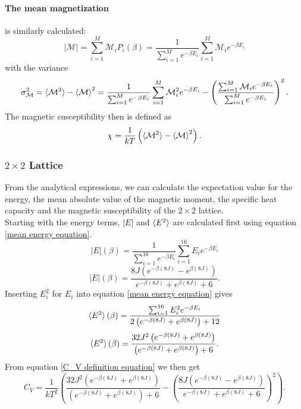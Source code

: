 \documentclass[10pt,a4paper]{article}
\begin{document}
\paragraph{The mean magnetization} is similarly calculated:
\begin{equation} \label{Mean magnetization definition equation}
 |\mathcal{M}| = \sum_{i=1}^{M} \mathcal{M}_iP_i(\beta) = \frac{1}{\sum_{i=1}^M e^{-\beta E_i}} \sum_{i=1}^M \mathcal{M}_ie^{-\beta E_i}
\end{equation} 
with the variance
\begin{equation}
\sigma_\mathcal{M}^2 = \braket{\mathcal{M}^2}-\braket{\mathcal{M}}^2 = \frac{1}{\sum_{i=1}^M e^{-\beta E_i}} \sum_{i=1}^M \mathcal{M}_i^2e^{-\beta E_i} - \left( \frac{\sum_{i=1}^M \mathcal{M}_ie^{-\beta E_i}}{\sum_{i=1}^M e^{-\beta E_i}} \right)^2.
\end{equation}
The magnetic susceptibility then is defined as
\begin{equation}\label{Magnetic susceptibility definition equation}
\chi = \frac{1}{kT} \left( \braket{\mathcal{M}^2}-\braket{\mathcal{M}}^2 \right).
\end{equation}
\subsubsection{$2\times2$ Lattice}
From the analytical expressions, we can calculate the expectation value for the energy, the mean absolute value of the magnetic moment, the specific heat capacity and the magnetic susceptibility of the $2\times 2$ lattice.\\Starting with the energy terms, $|E|$ and $\braket{E^2}$ are calculated first using equation \eqref{mean energy equation}.
\begin{equation*}
|E|(\beta) = \frac{1}{\sum_{i=1}^{16} e^{-\beta E_i}} \sum_{i=1}^{16} E_ie^{-\beta E_i}
\end{equation*}
\begin{equation}
|E|(\beta) = \frac{8J\left( e^{-\beta (8J)} -e^{\beta (8J)} \right)}{ e^{-\beta (8J)} +e^{\beta (8J)} +6}.
\end{equation}
Inserting $E_i^2$ for $E_i$ into equation \eqref{mean energy equation} gives
\begin{equation*}
\braket{E^2}(\beta) = \frac{\sum_{i=1}^{16} E_i^2e^{-\beta E_i}}{2\left( e^{-\beta (8J)} +e^{\beta (8J)} \right)+12}
\end{equation*}
\begin{equation}
\braket{E^2}(\beta) = \frac{32J^2\left( e^{-\beta (8J)} +e^{\beta (8J)} \right)}{\left( e^{-\beta (8J)} +e^{\beta (8J)} \right)+6}.
\end{equation}
From equation \eqref{C_V definition equation} we then get
\begin{equation}
C_V = \frac{1}{kT^2}\left( \frac{32J^2\left( e^{-\beta (8J)} +e^{\beta (8J)} \right)}{\left( e^{-\beta (8J)} +e^{\beta (8J)} \right)+6}  - \left( \frac{8J\left( e^{-\beta (8J)} -e^{\beta (8J)} \right)}{ e^{-\beta (8J)} +e^{\beta (8J)} +6} \right)^2 \right).
\end{equation}
\end{document}
